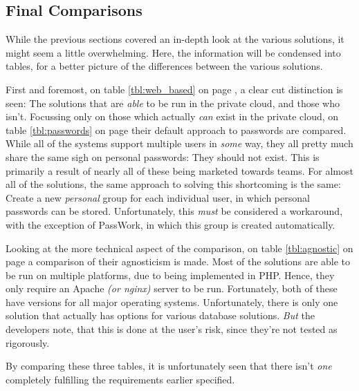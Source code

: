 		\subsection{Final Comparisons}
			\newcommand{\red}[1]{\cellcolor{red!50}#1}
			\newcommand{\green}[1]{\cellcolor{green!50}#1}
			\newcommand{\grey}[1]{\cellcolor{gray!50}#1}
			\newcommand{\yellow}[1]{\cellcolor{yellow!50}#1}
			\newcommand{\white}[1]{\cellcolor{white!50}#1}


			While the previous sections covered an in-depth look at the various solutions, it might seem a little overwhelming. Here, the information will be condensed into tables, for a better picture of the differences between the various solutions.

			First and foremost, on table \ref{tbl:web_based} on page \pageref{tbl:web_based}, a clear cut distinction is seen: The solutions that are \emph{able} to be run in the private cloud, and those who isn't. Focussing only on those which actually \emph{can} exist in the private cloud, on table \ref{tbl:passwords} on page \pageref{tbl:passwords} their default approach to passwords are compared. While all of the systems support multiple users in \emph{some} way, they all pretty much share the same sigh on personal passwords: They should not exist. This is primarily a result of nearly all of these being marketed towards teams. For almost all of the solutions, the same approach to solving this shortcoming is the same: Create a new \emph{personal} group for each individual user, in which personal passwords can be stored. Unfortunately, this \emph{must} be considered a workaround, with the exception of PassWork, in which this group is created automatically. 

			Looking at the more technical aspect of the comparison, on table \ref{tbl:agnostic} on page \pageref{tbl:agnostic} a comparison of their agnosticism is made. Most of the solutions are able to be run on multiple platforms, due to being implemented in PHP. Hence, they only require an Apache \emph{(or nginx)} server to be run. Fortunately, both of these have versions for all major operating systems. Unfortunately, there is only one solution that actually has options for various database solutions. \emph{But} the developers note, that this is done at the user's risk, since they're not tested as rigorously.

			By comparing these three tables, it is unfortunately seen that there isn't \emph{one} completely fulfilling the requirements earlier specified.



